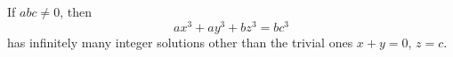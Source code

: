 \begin{proposition}
    If $abc\ne0$, then
\[
    ax^3+ay^3+bz^3=bc^3
\]
    has infinitely many integer solutions other than the trivial ones $x+y=0$, $z=c$.
\end{proposition}
